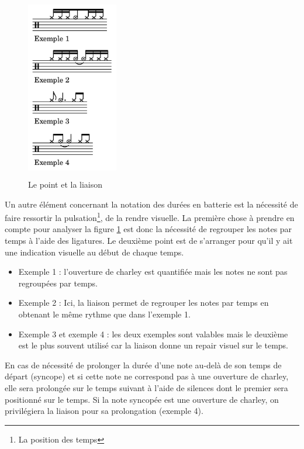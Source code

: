 \begin{figure}[h]
	\centering
	\includegraphics[height=80mm, width=40mm]{
    z_images/3_methodes/0_notation_de_la_batterie/3_point_et_liaison.png}
	\caption{Le point et la liaison}
	\label{point_liaison}
\end{figure}

Un autre élément concernant la notation des durées en batterie est la nécessité
de faire ressortir la pulsation\footnote{La position des temps}, de la rendre
visuelle. La première chose à prendre en compte pour analyser la figure
\ref{point_liaison} est donc la nécessité de regrouper les notes par temps à
l’aide des ligatures. Le deuxième point est de s’arranger pour qu’il y ait une
indication visuelle au début de chaque temps.

\begin{itemize}
    \item Exemple 1 : l’ouverture de charley est quantifiée mais les notes ne
        sont pas regroupées par temps.
    \item Exemple 2 : Ici, la liaison permet de regrouper les notes par temps
        en obtenant le même rythme que dans l’exemple 1.
    \item Exemple 3 et exemple 4 : les deux exemples sont valables mais le
        deuxième est le plus souvent utilisé car la liaison donne un repair
        visuel sur le temps.\\
\end{itemize}

En cas de nécessité de prolonger la durée d’une note au-delà 
de son temps de départ (syncope) et si cette note ne correspond pas à une
ouverture de charley, elle sera prolongée sur le temps suivant à l’aide de
silences dont le premier sera positionné sur le temps. Si la note syncopée est
une ouverture de charley, on privilégiera la liaison pour sa prolongation (exemple 4).

